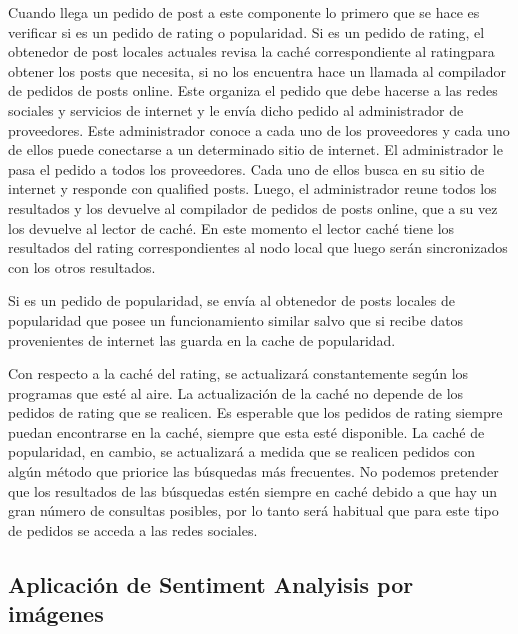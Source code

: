 Cuando llega un pedido de post a este componente lo primero que se hace es verificar si es un pedido de rating o popularidad. 
Si es un pedido de rating, el obtenedor de post locales actuales revisa la caché correspondiente al ratingpara obtener los posts que necesita, si no los encuentra hace un llamada al compilador de pedidos de posts online. Este organiza el pedido que debe hacerse a las redes sociales y servicios de internet y le envía dicho pedido al administrador de proveedores. Este administrador conoce a cada uno de los proveedores y cada uno de ellos puede conectarse a un determinado sitio de internet. El administrador le pasa el pedido a todos los proveedores. Cada uno de ellos busca en su sitio de internet y responde con qualified posts. Luego, el administrador reune todos los resultados y los devuelve al compilador de pedidos de posts online, que a su vez los devuelve al lector de caché. En este momento el lector caché tiene los resultados del rating correspondientes al nodo local que luego serán sincronizados con los otros resultados.

Si es un pedido de popularidad, se envía al obtenedor de posts locales de popularidad que posee un funcionamiento similar salvo que si recibe datos provenientes de internet las guarda en la cache de popularidad.

Con respecto a la caché del rating, se actualizará constantemente según los programas que esté al aire. La actualización de la caché no depende de los pedidos de rating que se realicen. Es esperable que los pedidos de rating siempre puedan encontrarse en la caché, siempre que esta esté disponible.
La caché de popularidad, en cambio, se actualizará a medida que se realicen pedidos con algún método que priorice las búsquedas más frecuentes. No podemos pretender que los resultados de las búsquedas estén siempre en caché debido a que hay un gran número de consultas posibles, por lo tanto será habitual que para este tipo de pedidos se acceda a las redes sociales. 


\subsection{Aplicación de Sentiment Analyisis por imágenes}

